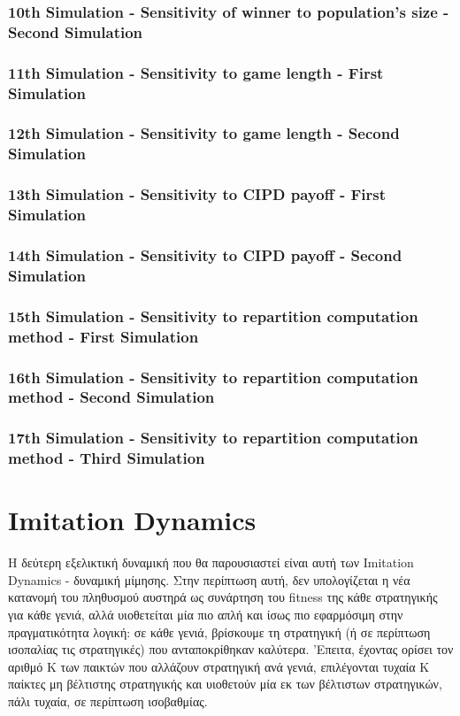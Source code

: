 \documentclass[12pt]{article}
\begin{document}
\subsubsection{10th Simulation - Sensitivity of winner to population's size - Second Simulation}

\subsubsection{11th Simulation - Sensitivity to game length - First Simulation}

\subsubsection{12th Simulation - Sensitivity to game length - Second Simulation}

\subsubsection{13th Simulation - Sensitivity to CIPD payoff - First Simulation}

\subsubsection{14th Simulation - Sensitivity to CIPD payoff - Second Simulation}

\subsubsection{15th Simulation - Sensitivity to repartition computation method - First Simulation}

\subsubsection{16th Simulation - Sensitivity to repartition computation method - Second Simulation}

\subsubsection{17th Simulation - Sensitivity to repartition computation method - Third Simulation}

\clearpage
\section{Imitation Dynamics}
Η δεύτερη εξελικτική δυναμική που θα παρουσιαστεί είναι αυτή των Imitation Dynamics - δυναμική μίμησης. Στην περίπτωση αυτή, δεν υπολογίζεται η νέα κατανομή του πληθυσμού αυστηρά ως συνάρτηση του fitness της κάθε στρατηγικής για κάθε γενιά, αλλά υιοθετείται μία πιο απλή και ίσως πιο εφαρμόσιμη στην πραγματικότητα λογική: σε κάθε γενιά, βρίσκουμε τη στρατηγική (ή σε περίπτωση ισοπαλίας τις στρατηγικές) που ανταποκρίθηκαν καλύτερα. 'Επειτα, έχοντας ορίσει τον αριθμό K των παικτών που αλλάζουν στρατηγική ανά γενιά, επιλέγονται τυχαία K παίκτες μη βέλτιστης στρατηγικής και υιοθετούν μία εκ των βέλτιστων στρατηγικών, πάλι τυχαία, σε περίπτωση ισοβαθμίας. 
\end{document}
